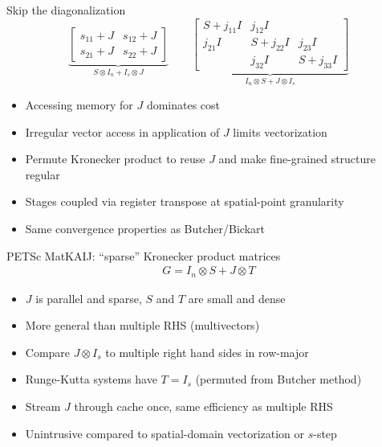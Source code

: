 \documentclass{beamer}
\begin{document}
\begin{frame}{Skip the diagonalization}
  \begin{equation*}
    \underbrace{\begin{bmatrix} s_{11} + J & s_{12} + J \\ s_{21} + J & s_{22} + J \end{bmatrix}}_{S\otimes I_n + I_s \otimes J} \qquad
    \underbrace{\begin{bmatrix} S + j_{11} I & j_{12}I & \\ j_{21}I & S + j_{22}I & j_{23}I \\  & j_{32}I & S + j_{33}I \end{bmatrix}}_{I_n \otimes S + J \otimes I_s}
  \end{equation*}
  \begin{itemize}
  \item Accessing memory for $J$ dominates cost
  \item Irregular vector access in application of $J$ limits vectorization
  \item Permute Kronecker product to reuse $J$ and make fine-grained structure regular
  \item Stages coupled via register transpose at spatial-point granularity
  \item Same convergence properties as Butcher/Bickart
  \end{itemize}
\end{frame}

\begin{frame}{PETSc MatKAIJ: ``sparse'' Kronecker product matrices}
  \begin{gather*}
    G = I_n \otimes S + J \otimes T
  \end{gather*}
  \begin{itemize}
  \item $J$ is parallel and sparse, $S$ and $T$ are small and dense
  \item More general than multiple RHS (multivectors)
  \item Compare $J \otimes I_s$ to multiple right hand sides in row-major
  \item Runge-Kutta systems have $T = I_s$ (permuted from Butcher method)
  \item Stream $J$ through cache once, same efficiency as multiple RHS
  \item Unintrusive compared to spatial-domain vectorization or $s$-step
  \end{itemize}
\end{frame}
\end{document}
